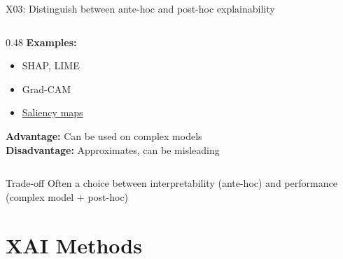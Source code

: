 \documentclass[aspectratio=169, 10pt]{beamer}
\begin{document}
\begin{frame}{X03: Distinguish between ante-hoc and post-hoc explainability}
\begin{columns}[T]
\begin{column}{0.48\textwidth}
            \vspace{0.2cm}
            \textbf{Examples:}
            \begin{itemize}
                \item SHAP, LIME
                \item Grad-CAM
                \item \href{https://en.wikipedia.org/wiki/Saliency_map}{Saliency maps}
            \end{itemize}
            
            \vspace{0.2cm}
            \textbf{Advantage:} Can be used on complex models \\
            \textbf{Disadvantage:} Approximates, can be misleading
        \end{column}
    \end{columns}
    
    \vspace{0.1cm}
    {\small
    \begin{alertblock}{Trade-off}
        Often a choice between interpretability (ante-hoc) and performance (complex model + post-hoc)
    \end{alertblock}
    }
\end{frame}

\section{XAI Methods}
\end{document}

